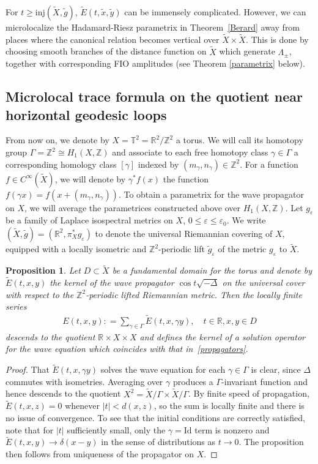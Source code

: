 \documentclass[11pt,letterpaper,oneside]{amsart}
\newcommand{\Z}{\mathbb{Z}}
\newcommand{\R}{\mathbb{R}}
\newcommand{\T}{\mathbb{T}}
\newcommand{\Id}{\text{Id}}
\newcommand{\inj}{\text{inj}}
\newtheorem{prop}[theo]{Proposition}
\theoremstyle{definition}
\theoremstyle{remark}
\newcommand{\eps}{\varepsilon}
\newcommand{\wt}{\widetilde}
\newcommand{\dt}{\delta}
\theoremstyle{definition}
\theoremstyle{remark}
\begin{document}
For $t \geq \inj(\wt X, \wt g)$, $\wt E(t,\wt x, \wt y)$ can be immensely complicated. However, we can microlocalize the Hadamard-Riesz parametrix in Theorem~\ref{Berard} away from places where the canonical relation becomes vertical over $\wt X \times \wt X$. This is done by choosing smooth branches of the distance function on $\wt X$ which generate $\Lambda_\pm$, together with corresponding FIO amplitudes (see Theorem \ref{parametrix} below).
		
	

\subsection{Microlocal trace formula on the quotient near horizontal geodesic loops}

From now on, we denote by $X = \T^2 = \R^2/ \Z^2$ a torus. We will call its homotopy group $\Gamma = \Z^2 \cong H_1(X, \Z)$ and associate to each free homotopy class $\gamma \in \Gamma$ a corresponding homology class $[\gamma]$ indexed by $(m_\gamma,n_\gamma) \in \Z^2$. For a function $f \in C^\infty(\wt X)$, we will denote by $\gamma^* f(x)$ the function $f(\gamma x) = f(x + (m_\gamma, n_\gamma))$. To obtain a parametrix for the wave propagator on $X$, we will average the parametrices constructed above over $H_1 (X, \Z)$. Let $g_\eps$ be a family of Laplace isospectral metrics on $X$, $0 \leq \eps \leq \eps_0$. We write $(\wt{X}, \wt{g}) = (\R^2, \pi_X^*g_\eps)$ to denote the universal Riemannian covering of $X$, equipped with a locally isometric and $\Z^2$-periodic lift $\wt{g}_\eps$ of the metric $g_\eps$ to $\wt{X}$. 
\begin{prop}
    Let $D \subset \wt X$ be a fundamental domain for the torus and denote by $\wt E(t,x,y)$ the kernel of the wave propagator $\cos t \sqrt{-\Delta}$ on the universal cover with respect to the $\Z^2$-periodic lifted Riemannian metric. Then the locally finite series
    \begin{align*}
        E(t,x,y) : = \sum_{\gamma \in \Gamma} \wt E (t, x, \gamma y), \quad t \in \R, x, y \in D
    \end{align*}
    descends to the quotient $\R \times X \times X$ and defines the kernel of a solution operator for the wave equation which coincides with that in~\eqref{propagators}.
\end{prop}

\begin{proof}
    That $\wt E(t, x, \gamma y )$ solves the wave equation for each $\gamma \in \Gamma$ is clear, since $\Delta$ commutes with isometries. Averaging over $\gamma$ produces a $\Gamma$-invariant function and hence descends to the quotient $X^2 = \wt X / \Gamma \times \wt X / \Gamma$. By finite speed of propagation, $\wt E (t, x, z) = 0$ whenever $|t| < d(x,z)$, so the sum is locally finite and there is no issue of convergence. To see that the initial conditions are correctly satisfied, note that for $|t|$ sufficiently small, only the $\gamma = \Id$ term is nonzero and $\wt E(t,x,y) \to \dt(x-y)$ in the sense of distributions as $t \to 0$. The proposition then follows from uniqueness of the propagator on $X$.
\end{proof}
\end{document}
